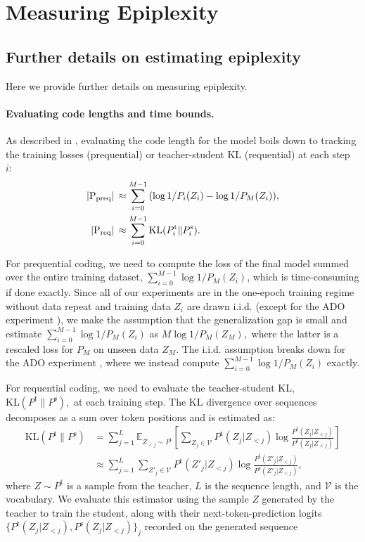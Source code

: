 \documentclass[twoside]{article}
\newcommand{\E}{\mathbb{E}}
\begin{document}
\section{Measuring Epiplexity}\label{app:measure}
\subsection{Further details on estimating epiplexity} \label{app:detail-procedure}
Here we provide further details on measuring epiplexity.
\paragraph{Evaluating code lengths and time bounds.}
As described in , evaluating the code length for the model boils down to tracking the training losses (prequential) or teacher-student KL (requential) at each step $i:$
\begin{align}
    |\mathrm{P}_{\mathrm{preq}}| &\,\approx \sum_{i=0}^{M-1} \qty(\log 1/P_i(Z_i) - \log 1/P_M(Z_i)), \\
    |\mathrm{P}_{\mathrm{req}}| &\,\approx \sum_{i=0}^{M-1} \mathrm{KL}(P^{\mathrm{t}}_i\|P^{\mathrm{s}}_i).
\end{align}

For prequential coding, we need to compute the loss of the final model summed over the entire training dataset, $\sum_{i=0}^{M-1} \log 1/P_M(Z_i)$, which is time-consuming if done exactly. Since all of our experiments are in the one-epoch training regime without data repeat and training data $Z_i$ are drawn i.i.d. (except for the ADO experiment ), we make the assumption that the generalization gap is small and estimate $\sum_{i=0}^{M-1} \log 1/P_M(Z_i)$ as $M \log 1/P_{M}(Z_{M}),$ where the latter is a rescaled loss for $P_M$ on unseen data $Z_M.$ The i.i.d. assumption breaks down for the ADO experiment , where we instead compute $\sum_{i=0}^{M-1} \log 1/P_M(Z_i)$ exactly.

For requential coding, we need to evaluate the teacher-student KL, $\mathrm{KL}(P^{\mathrm{t}}\|P^{\mathrm{s}}),$ at each training step. The KL divergence over sequences decomposes as a sum over token positions and is estimated as:
\begin{align}
\mathrm{KL}(P^{\mathrm{t}}\|P^{\mathrm{s}}) &= \sum_{j=1}^{L} \E_{Z_{<j} \sim P^{\mathrm{t}}} \left[ \sum_{Z_j \in \mathcal{V}} P^{\mathrm{t}}(Z_j | Z_{<j}) \log \frac{P^{\mathrm{t}}(Z_j | Z_{<j})}{P^{\mathrm{s}}(Z_j | Z_{<j})} \right] \\
&\approx \sum_{j=1}^{L} \sum_{Z'_j \in \mathcal{V}} P^{\mathrm{t}}(Z'_j | Z_{<j}) \log \frac{P^{\mathrm{t}}(Z'_j | Z_{<j})}{P^{\mathrm{s}}(Z'_j | Z_{<j})},
\end{align}
where $Z \sim P^{\mathrm{t}}$ is a sample from the teacher, $L$ is the sequence length, and $\mathcal{V}$ is the vocabulary. We evaluate this estimator using the sample $Z$ generated by the teacher to train the student, along with their next-token-prediction logits $\{P^{\mathrm{t}}(Z_j|Z_{<j}), P^{\mathrm{s}}(Z_j|Z_{<j})\}_j$ recorded on the generated sequence
\end{document}
